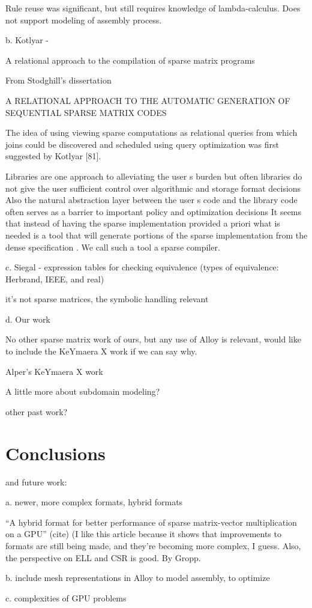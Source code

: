 \documentclass{article}
\begin{document}
\cbstart
Rule reuse was significant, but still requires knowledge of lambda-calculus. Does not support modeling of assembly process.
\cbend

b. Kotlyar -

A relational approach to the compilation of sparse matrix programs

\cite{kotlyar1997relational}

From Stodghill's dissertation

A RELATIONAL APPROACH TO THE AUTOMATIC GENERATION OF SEQUENTIAL SPARSE
MATRIX CODES

The idea of using viewing sparse computations as relational queries
from which joins could be discovered and scheduled using query
optimization was first suggested by Kotlyar [81].

Libraries are one approach to alleviating the user s burden but often
libraries do not give the user sufficient control over algorithmic and
storage format decisions Also the natural abstraction layer between
the user s code and the library code often serves as a barrier to
important policy and optimization decisions It seems that instead of
having the sparse implementation provided a priori what is needed is a
tool that will generate portions of the sparse implementation from the
dense specification . We call such a tool a sparse compiler.

c. Siegal - expression tables for checking equivalence (types of
           equivalence: Herbrand, IEEE, and real)

it's not sparse matrices, the symbolic handling relevant

d. Our work

No other sparse matrix work of ours, but any use of Alloy is relevant,
would like to include the KeYmaera X work if we can say why.

Alper's KeYmaera X work

A little more about subdomain modeling?

other past work?


\section{Conclusions}

and future work:

a. newer, more complex formats, hybrid formats

``A hybrid format for better performance of sparse matrix-vector
multiplication on a GPU'' (cite) (I like this article because it shows
that improvements to formats are still being made, and they're
becoming more complex, I guess.  Also, the perspective on ELL and CSR
is good.  By Gropp.

b. include mesh representations in Alloy to model assembly, to optimize

c. complexities of GPU problems



\end{document}
